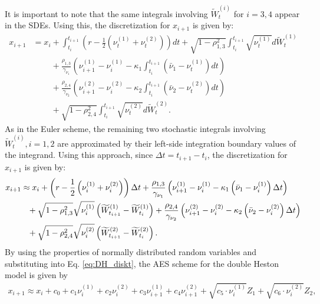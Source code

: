 \documentclass[]{interact}
\theoremstyle{plain}%
\theoremstyle{definition}
\theoremstyle{remark}
\begin{document}
It is important to note that the same integrals involving $\widetilde{W}_t^{(i)}$ for $i=3,4$ appear in the SDEs. Using this, the discretization for $x_{i+1}$ is given by:
\begin{align*}
x_{i+1} &= x_{i} + \int_{t_{i}}^{t_{i+1}} \left(r - \frac{1}{2} \left(\nu_{t}^{(1)} + \nu_{t}^{(2)}\right) \right) dt + \sqrt{1 - \rho_{1,3}^{2}} \int_{t_{i}}^{t_{i+1}} \sqrt{\nu_{t}^{(1)}} d \widetilde{W}_t^{(1)} \\
&\phantom{= x_{i}} + \frac{\rho_{1,3}}{\gamma_{\nu_{1}}} \left(\nu_{i+1}^{(1)} - \nu_{i}^{(1)} - \kappa_1 \int_{t_{i}}^{t_{i+1}} \left(\bar{\nu}_{1} - \nu_{t}^{(1)}\right) dt\right) \\
&\phantom{= x_{i}} + \frac{\rho_{2,4}}{\gamma_{\nu_{2}}} \left(\nu_{i+1}^{(2)} - \nu_{i}^{(2)} - \kappa_2 \int_{t_{i}}^{t_{i+1}} \left(\bar{\nu}_{2} - \nu_{t}^{(2)}\right) dt\right) \\
&\phantom{= x_{i}} + \sqrt{1 - \rho_{2,4}^{2}} \int_{t_{i}}^{t_{i+1}} \sqrt{\nu_{t}^{(2)}} d \widetilde{W}_t^{(2)}.
\end{align*}
As in the Euler scheme, the remaining two stochastic integrals involving $\widetilde{W}_t^{(i)}, i=1,2$ are approximated by their left-side integration boundary values of the integrand. Using this approach, since $\Delta t = t_{i+1} - t_i$, the discretization for $x_{i+1}$ is given by:
\begin{align}\label{eq:DH_diskt}
x_{i+1} &\approx x_{i} + \left(r - \frac{1}{2} \left(\nu_{i}^{(1)} + \nu_{i}^{(2)} \right)\right) \Delta t 
+ \frac{\rho_{1,3}}{\gamma_{\nu_{1}}} \left(\nu_{i+1}^{(1)} - \nu_{i}^{(1)} - \kappa_1 \left(\bar{\nu}_{1} - \nu_{i}^{(1)}\right) \Delta t\right) \notag \\
&\phantom{=} + \sqrt{1 - \rho_{1,3}^{2}} \sqrt{\nu_{i}^{(1)}} \left(\widetilde{W}_{t_{i+1}}^{(1)} - \widetilde{W}_{t_{i}}^{(1)}\right)
+ \frac{\rho_{2,4}}{\gamma_{\nu_{2}}} \left(\nu_{i+1}^{(2)} - \nu_{i}^{(2)} - \kappa_2 \left(\bar{\nu}_{2} - \nu_{i}^{(2)}\right) \Delta t\right) \notag \\
&\phantom{=} + \sqrt{1 - \rho_{2,4}^{2}} \sqrt{\nu_{i}^{(2)}} \left(\widetilde{W}_{t_{i+1}}^{(2)} - \widetilde{W}_{t_{i}}^{(2)}\right).
\end{align}
By using the properties of normally distributed random variables and substituting into Eq. \eqref{eq:DH_diskt}, the AES scheme for the double Heston model is given by
\begin{align*}
    x_{i+1} \approx x_{i} + c_0 + c_1 \nu_{i}^{(1)} + c_2 \nu_{i}^{(2)} + c_3 \nu_{i+1}^{(1)} + c_4 \nu_{i+1}^{(2)} +
    \sqrt{c_5 \cdot \nu_{i}^{(1)}} Z_1 + \sqrt{c_6 \cdot \nu_{i}^{(2)}} Z_2,
\end{align*}
\end{document}
